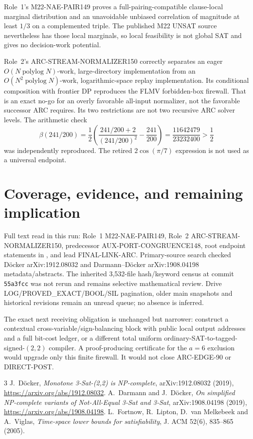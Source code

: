 \documentclass[11pt]{article}
\begin{document}
Role~1's M22-NAE-PAIR149 proves a full-pairing-compatible clause-local marginal distribution and an unavoidable unbiased correlation of magnitude at least $1/3$ on a complemented triple.  The published M22 UNSAT source nevertheless has those local marginals, so local feasibility is not global SAT and gives no decision-work potential.

Role~2's ARC-STREAM-NORMALIZER150 correctly separates an eager $O(N\operatorname{polylog}N)$-work, large-directory implementation from an $O(N^2\operatorname{polylog}N)$-work, logarithmic-space replay implementation.  Its conditional composition with frontier DP reproduces the FLMV forbidden-box firewall.  That is an exact no-go for an overly favorable all-input normalizer, not the favorable successor ARC requires.  Its two restrictions are not two recursive ARC solver levels.  The arithmetic check
\[
 \beta(241/200)=\frac12\left(\frac{241/200+2}{(241/200)^2}-\frac{241}{200}\right)
 =\frac{11642479}{23232400}>\frac12
\]
was independently reproduced.  The retired $2\cos(\pi/7)$ expression is not used as a universal endpoint.

\section{Coverage, evidence, and remaining implication}
Full text read in this run: Role~1 M22-NAE-PAIR149, Role~2 ARC-STREAM-NORMALIZER150, predecessor AUX-PORT-CONGRUENCE148, root endpoint statements in , and lead FINAL-LINK-ARC.  Primary-source search checked D\"ocker arXiv:1912.08032 and Darmann--D\"ocker arXiv:1908.04198 metadata/abstracts.  The inherited 3,532-file hash/keyword census at commit \texttt{55a3fcc} was not rerun and remains selective mathematical review.  Drive LOG/PROVED\_EXACT/BOOL/SIL pagination, older main snapshots and historical revisions remain an unread queue; no absence is inferred.

The exact next receiving obligation is unchanged but narrower: construct a contextual cross-variable/sign-balancing block with public local output addresses and a full bit-cost ledger, or a different total uniform ordinary-SAT-to-tagged-signed-$(2,2)$ compiler.  A proof-producing certificate for the $a=6$ exclusion would upgrade only this finite firewall.  It would not close ARC-EDGE-90 or DIRECT-POST.

\begin{thebibliography}{3}
 J.~D\"ocker, \emph{Monotone 3-Sat-(2,2) is NP-complete}, arXiv:1912.08032 (2019), \url{https://arxiv.org/abs/1912.08032}.
 A.~Darmann and J.~D\"ocker, \emph{On simplified NP-complete variants of Not-All-Equal 3-Sat and 3-Sat}, arXiv:1908.04198 (2019), \url{https://arxiv.org/abs/1908.04198}.
 L.~Fortnow, R.~Lipton, D.~van Melkebeek and A.~Viglas, \emph{Time-space lower bounds for satisfiability}, J. ACM 52(6), 835--865 (2005).
\end{thebibliography}
\end{document}
